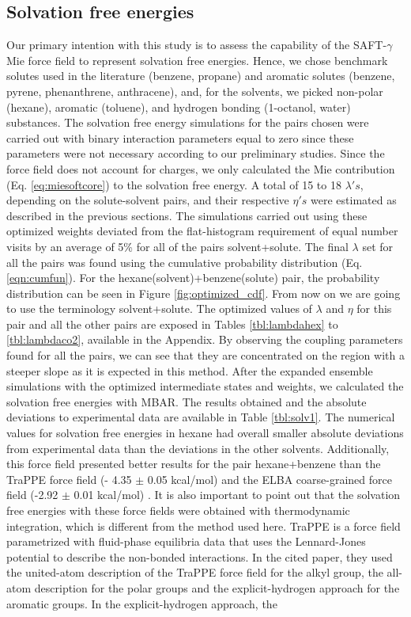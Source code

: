 \documentclass[final,12p,times,twocolumn]{elsarticle}
\begin{document}
	\subsection{Solvation free energies}
	
	Our primary intention with this study is to assess the capability of the SAFT-$\gamma$ Mie force field to represent solvation free energies. Hence, we chose benchmark solutes used in the literature (benzene, propane) and aromatic solutes (benzene, pyrene, phenanthrene, anthracene), and, for the solvents, we picked non-polar (hexane), aromatic (toluene), and hydrogen bonding (1-octanol, water) substances. The solvation free energy simulations for the pairs chosen were carried out with binary interaction parameters equal to zero since these parameters were not necessary according to our preliminary studies. Since the force field does not account for charges, we only calculated the Mie contribution (Eq. \ref{eq:miesoftcore}) to the solvation free energy. A total of 15 to 18 $\lambda 's$, depending on the solute-solvent pairs, and their respective $\eta 's$ were estimated as described in the previous sections. The simulations carried out using these optimized weights deviated from the flat-histogram requirement of equal number visits by an average of 5\% for all of the pairs solvent+solute. The final $\lambda$ set for all the pairs was found using the cumulative probability distribution (Eq. \eqref{eqn:cumfun}). For the hexane(solvent)+benzene(solute) pair, the probability distribution  can be seen in Figure \ref{fig:optimized_cdf}. From now on we are going to use the terminology solvent+solute. The optimized values of $\lambda$ and $\eta$ for this pair and all the other pairs are exposed in Tables \ref{tbl:lambdahex} to \ref{tbl:lambdaco2}, available in the Appendix. By observing the coupling parameters found for all the pairs, we can see that they are concentrated on the region with a steeper slope as it is expected in this method. After the expanded ensemble simulations with the optimized intermediate states and weights, we calculated the solvation free energies with MBAR. The results obtained and the absolute deviations to experimental data \cite{doi:10.1021/ci034120c} are available  in Table \ref{tbl:solv1}. The numerical values for solvation free energies in hexane had overall smaller absolute deviations from experimental data than the deviations in the other solvents. Additionally, this force field presented better results for the pair hexane+benzene than the TraPPE force field (- 4.35  $\pm$ 0.05 kcal/mol) \cite{garrido2011} and the ELBA coarse-grained force field  (-2.92 $\pm$ 0.01 kcal/mol) \cite{doi:10.1021/acs.jctc.5b00963}. It is also important to point out that the solvation free energies with these force fields were obtained with thermodynamic integration, which is different from the method used here. TraPPE is a force field parametrized with fluid-phase equilibria data that uses the Lennard-Jones potential to describe the non-bonded interactions. In the cited paper, they used the united-atom description of the TraPPE force field for the alkyl group, the all-atom description for the polar groups and the explicit-hydrogen approach for the aromatic groups. In the explicit-hydrogen approach, the 
\end{document}
